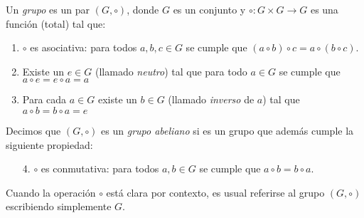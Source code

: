 

\begin{definition}
Un \emph{grupo} es un par $(G,\circ)$, donde $G$ es un conjunto y $\circ \colon G\times G\to G$ es una función (total) tal que:
\begin{enumerate}
	\item $\circ$ es asociativa: para todos $a,b,c \in G$ se cumple que $(a \circ b) \circ c = a \circ (b
\circ c)$.

	\item Existe un $e \in G$ (llamado \emph{neutro}) tal que para todo $a \in G$ se cumple que $a \circ e = e \circ a = a$

   \item Para cada $a \in G$ existe un $b \in G$ (llamado \emph{inverso} de $a$) tal que $a \circ b 	= b \circ a = e$
\end{enumerate}
Decimos que $(G,\circ)$ es un \emph{grupo abeliano} si es un grupo que además cumple la siguiente propiedad:
\begin{enumerate}
	\item[4.] $\circ$ es conmutativa: para todos $a,b\in G$ se cumple que $a\circ b = b\circ a$. 
\end{enumerate}
\end{definition}

Cuando la operación $\circ$ está clara por contexto, es usual referirse al grupo $(G, \circ)$ escribiendo simplemente $G$.


